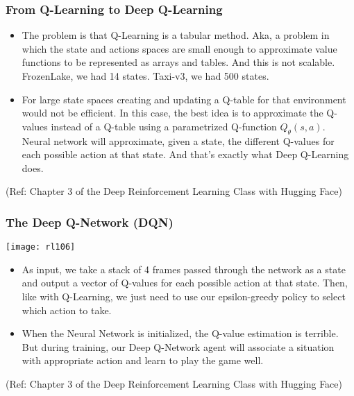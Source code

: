 \begin{frame}[fragile]\frametitle{From Q-Learning to Deep Q-Learning}

\begin{itemize}
\item The problem is that Q-Learning is a tabular method. Aka, a problem in which the state and actions spaces are small enough to approximate value functions to be represented as arrays and tables. And this is not scalable. FrozenLake, we had 14 states. Taxi-v3, we had 500 states.
\item For large state spaces creating and updating a Q-table for that environment would not be efficient. In this case, the best idea is to approximate the Q-values instead of a Q-table using a parametrized Q-function $Q_{\theta}(s,a)$. Neural network will approximate, given a state, the different Q-values for each possible action at that state. And that's exactly what Deep Q-Learning does.
\end{itemize}


{\tiny (Ref: Chapter 3 of the Deep Reinforcement Learning Class with Hugging Face)}

\end{frame}

\begin{frame}[fragile]\frametitle{The Deep Q-Network (DQN)}

\begin{center}
\texttt{[image: rl106]}
\end{center}

\begin{itemize}
\item As input, we take a stack of 4 frames passed through the network as a state and output a vector of Q-values for each possible action at that state. Then, like with Q-Learning, we just need to use our epsilon-greedy policy to select which action to take.

\item When the Neural Network is initialized, the Q-value estimation is terrible. But during training, our Deep Q-Network agent will associate a situation with appropriate action and learn to play the game well.
\end{itemize}

{\tiny (Ref: Chapter 3 of the Deep Reinforcement Learning Class with Hugging Face)}

\end{frame}

